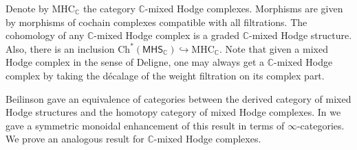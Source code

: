 \documentclass[a4paper]{amsart}
\theoremstyle{definition}
\theoremstyle{theorem}
\newcommand{\CC}{\mathbb{C}}
\newcommand{\ch}[1]{\mathrm{Ch^*({#1})}}
\newcommand{\MHS}{{\mathsf{MHS}}}
\newcommand{\MHC}{{\mathrm{MHC}}}
\begin{document}
Denote by $\MHC_\CC$ the category $\CC$-mixed Hodge complexes.
Morphisms are given by morphisms of cochain complexes compatible with all filtrations.
The cohomology of any $\CC$-mixed Hodge complex is a graded $\CC$-mixed Hodge structure. Also, there is an inclusion 
$\ch{\MHS_\CC}\hookrightarrow \MHC_\CC$.
Note that given a mixed Hodge complex in the sense of Deligne, one may always get a $\CC$-mixed Hodge 
complex by taking the décalage of the weight filtration on its complex part.

Beilinson gave an equivalence of categories between the derived category of mixed
Hodge structures and the homotopy category of mixed Hodge complexes. In \cite{CiHo} we gave a symmetric monoidal enhancement of this result in terms of $\infty$-categories. We prove an analogous result for $\CC$-mixed Hodge complexes. 
\end{document}
